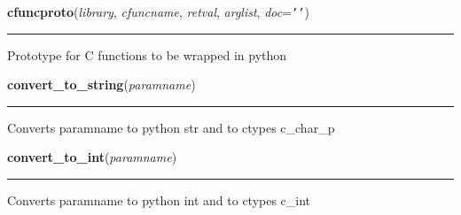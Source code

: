     \label{xformslib:library:cfuncproto}

    \vspace{0.5ex}

\hspace{.8\funcindent}\begin{boxedminipage}{\funcwidth}

    \raggedright \textbf{cfuncproto}(\textit{library}, \textit{cfuncname}, \textit{retval}, \textit{arglist}, \textit{doc}={\tt \texttt{'}\texttt{}\texttt{'}})

    \vspace{-1.5ex}

    \rule{\textwidth}{0.5\fboxrule}
\setlength{\parskip}{2ex}
    Prototype for C functions to be wrapped in python

\setlength{\parskip}{1ex}
    \end{boxedminipage}

    \label{xformslib:library:convert_to_string}

    \vspace{0.5ex}

\hspace{.8\funcindent}\begin{boxedminipage}{\funcwidth}

    \raggedright \textbf{convert\_to\_string}(\textit{paramname})

    \vspace{-1.5ex}

    \rule{\textwidth}{0.5\fboxrule}
\setlength{\parskip}{2ex}
    Converts paramname to python str and to ctypes c\_char\_p

\setlength{\parskip}{1ex}
    \end{boxedminipage}

    \label{xformslib:library:convert_to_int}

    \vspace{0.5ex}

\hspace{.8\funcindent}\begin{boxedminipage}{\funcwidth}

    \raggedright \textbf{convert\_to\_int}(\textit{paramname})

    \vspace{-1.5ex}

    \rule{\textwidth}{0.5\fboxrule}
\setlength{\parskip}{2ex}
    Converts paramname to python int and to ctypes c\_int

\setlength{\parskip}{1ex}
    \end{boxedminipage}

